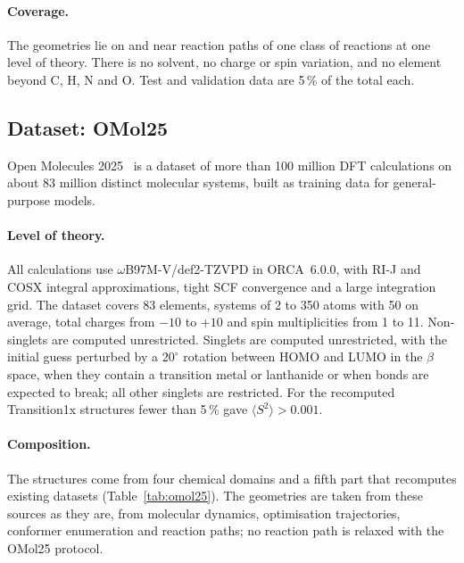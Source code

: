 \paragraph{Coverage.} The geometries lie on and near reaction paths of
one class of reactions at one level of theory. There is no solvent, no
charge or spin variation, and no element beyond C, H, N and O. Test and
validation data are 5\,\% of the total each.

\subsection{Dataset: OMol25}
\label{sec:dataset-omol}

Open Molecules 2025~\cite{omol25} is a dataset of more than 100 million
DFT calculations on about 83 million distinct molecular systems, built as
training data for general-purpose models.

\paragraph{Level of theory.} All calculations use
\mbox{$\omega$B97M-V/def2-TZVPD} in ORCA~6.0.0, with RI-J and COSX
integral approximations, tight SCF convergence and a large integration
grid. The dataset covers 83 elements, systems of 2 to 350 atoms with 50
on average, total charges from $-10$ to $+10$ and spin multiplicities
from 1 to 11. Non-singlets are computed unrestricted. Singlets are
computed unrestricted, with the initial guess perturbed by a $20^\circ$
rotation between HOMO and LUMO in the $\beta$ space, when they contain a
transition metal or lanthanide or when bonds are expected to break; all
other singlets are restricted. For the recomputed Transition1x structures
fewer than 5\,\% gave $\langle S^2 \rangle > 0.001$.

\paragraph{Composition.} The structures come from four chemical domains
and a fifth part that recomputes existing datasets
(Table~\ref{tab:omol25}). The geometries are taken from these sources as
they are, from molecular dynamics, optimisation trajectories, conformer
enumeration and reaction paths; no reaction path is relaxed with the
OMol25 protocol.

